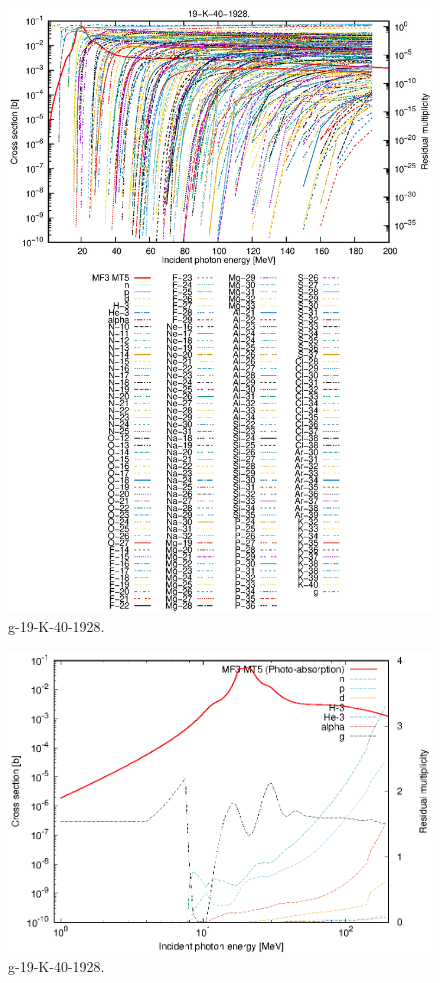\begin{figure}
 \includegraphics[width=\linewidth]{eps/g_19-K-40_1928.eps}
  \caption{g-19-K-40-1928.}
\end{figure}
\newpage \clearpage

\begin{figure}
 \includegraphics[width=\linewidth]{eps-log/g_19-K-40_1928.eps}
 \caption{g-19-K-40-1928.}
\end{figure}
\newpage \clearpage

